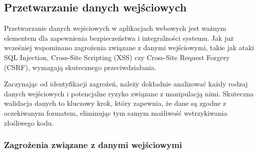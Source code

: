 \documentclass[12pt,twoside]{article}
\begin{document}

\subsection{Przetwarzanie danych wejściowych}

Przetwarzanie danych wejściowych w aplikacjach webowych jest ważnym elementem dla zapewnienia bezpieczeństwa i integralności systemu. Jak już wcześniej wspominano zagrożenia związane z danymi wejściowymi, takie jak ataki SQL Injection, Cross-Site Scripting (XSS) czy Cross-Site Request Forgery (CSRF), wymagają skutecznego przeciwdziałania.

Zaczynając od identyfikacji zagrożeń, należy dokładnie analizować każdy rodzaj danych wejściowych i potencjalne ryzyko związane z manipulacją nimi. Skuteczna walidacja danych to kluczowy krok, który zapewnia, że dane są zgodne z oczekiwanym formatem, eliminując tym samym możliwość wstrzykiwania złośliwego kodu.

\subsubsection{Zagrożenia związane z danymi wejściowymi}
\end{document}
